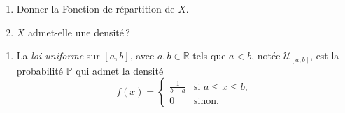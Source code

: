 \begin{enumerate}
\def\labelenumi{\arabic{enumi}.}
\tightlist
\item
  Donner la Fonction de répartition de \(X\).
\item
  \(X\) admet-elle une densité\,?
\end{enumerate}


\begin{exemple}\label{I-exampledens}

\begin{enumerate}
\def\labelenumi{\arabic{enumi}.}
\item
  La \emph{loi uniforme} sur \([a,b]\), avec \(a,b \in \mathbb{R}\) tels
  que \(a < b\), notée \(\mathcal{U}_{[a,b]}\), est la probabilité
  \(\mathbb{P}\) qui admet la densité \[f(x) = \left\{\begin{array}{ll}
          \frac{1}{b-a} & \text{si } a \leq x \leq b,\\
          0 & \text{sinon}.
          \end{array}\right.\] 
          

\end{enumerate}
\end{exemple}
